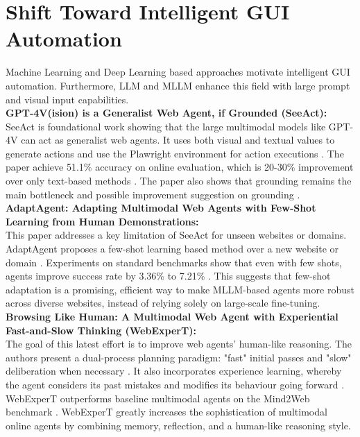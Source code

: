 \section{Shift Toward Intelligent GUI Automation} 
Machine Learning and Deep Learning based approaches motivate intelligent GUI automation. Furthermore, LLM and MLLM enhance this field with large prompt and visual input capabilities.\\ 
\textbf{GPT‑4V(ision) is a Generalist Web Agent, if Grounded (SeeAct):}\\
SeeAct \cite{SeeAct} is foundational work showing that the large multimodal models like GPT-4V can act as generalist web agents. It uses both visual and textual values to generate actions and use the Plawright environment for action executions \cite{SeeAct}. The paper achieve 51.1\% accuracy on online evaluation, which is 20-30\% improvement over only text-based methods \cite{SeeAct}. The paper also shows that grounding remains the main bottleneck and possible improvement suggestion on grounding \cite{SeeAct}. \\
\textbf{AdaptAgent: Adapting Multimodal Web Agents with Few‑Shot Learning from Human Demonstrations:}\\
This paper addresses a key limitation of SeeAct for unseen websites or domains. AdaptAgent proposes a few-shot learning based method over a new website or domain \cite{FewShotLearning:verma2024adaptagentadaptingmultimodalweb}. Experiments on standard benchmarks show that even with few shots, agents improve success rate by 3.36\% to 7.21\% \cite{FewShotLearning:verma2024adaptagentadaptingmultimodalweb}.
This suggests that few-shot adaptation is a promising, efficient way to make MLLM-based agents more robust across diverse websites, instead of relying solely on large-scale fine-tuning.\\
\textbf{Browsing Like Human: A Multimodal Web Agent with Experiential Fast-and-Slow Thinking (WebExperT):}\\
The goal of this latest effort is to improve web agents' human-like reasoning.  The authors present a dual-process planning paradigm: "fast" initial passes and "slow" deliberation when necessary \cite{Browsinglikehuman:luo2025browsing}. It also incorporates experience learning, whereby the agent considers its past mistakes and modifies its behaviour going forward \cite{Browsinglikehuman:luo2025browsing}.  WebExperT outperforms baseline multimodal agents on the Mind2Web benchmark \cite{Browsinglikehuman:luo2025browsing}. WebExperT greatly increases the sophistication of multimodal online agents by combining memory, reflection, and a human-like reasoning style.

